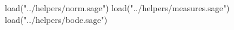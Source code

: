 \begin{sagesilent}
    load("../helpers/norm.sage")
    load("../helpers/measures.sage")
    load("../helpers/bode.sage")
\end{sagesilent}